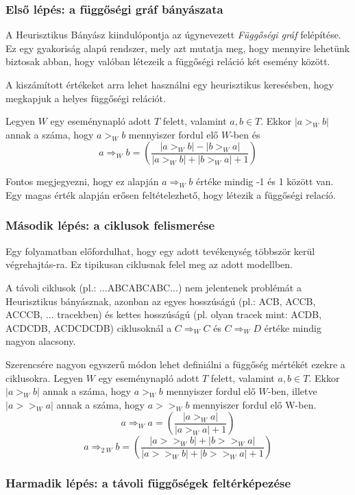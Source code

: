 \subsubsection{Első lépés: a függőségi gráf bányászata}

 A Heurisztikus Bányász kiindulópontja az úgynevezett \textit{Függőségi gráf} felépítése. Ez egy gyakoriság alapú rendszer, mely azt mutatja meg, hogy mennyire lehetünk biztosak abban, hogy valóban létezeik a függőségi reláció két esemény között.

A kiszámított értékeket arra lehet használni egy heurisztikus keresésben, hogy megkapjuk a helyes függőségi relációt.

Legyen $W$ egy eseménynapló adott $T$ felett, valamint $a,b \in T$. Ekkor $|a>_W b|$ annak a száma, hogy $a>_Wb$ mennyiszer fordul elő $W$-ben és
\[
a \Rightarrow_W b = \left(\frac{|a>_Wb|-|b>_Wa|}{|a>_Wb|+|b>_Wa|+1}\right)
\]

Fontos megjegyezni, hogy ez alapján $a\Rightarrow_Wb$ értéke mindig -1 és 1 között van. Egy magas érték alapján erősen feltételezhető, hogy létezik a függőségi relacíó.

\subsubsection{Második lépés: a ciklusok felismerése}

Egy folyamatban előfordulhat, hogy egy adott tevékenység többször kerül végrehajtás\hyp{}ra. Ez tipikusan ciklusnak felel meg az adott modellben.

A távoli ciklusok (pl.: ...ABCABCABC...) nem jelentenek problémát a Heurisztikus bányásznak, azonban az egyes hosszúságú (pl.: ACB, ACCB, ACCCB, ... tracekben) és kettes hosszúságú (pl. olyan tracek mint: ACDB, ACDCDB, ACDCDCDB) ciklusoknál a $C\Rightarrow_WC$ és $C\Rightarrow_WD$ értéke mindig nagyon alacsony.

Szerencsére nagyon egyszerű módon lehet definiálni a függőség mértékét ezekre a ciklusokra. Legyen $W$ egy eseménynapló adott $T$ felett, valamint $a,b \in T$. Ekkor $|a>_W b|$ annak a száma, hogy $a>_Wb$ mennyiszer fordul elő $W$-ben, illetve $|a>>_Wa|$ annak a száma, hogy $a>>_Wb$ mennyiszer fordul elő W-ben.
\[
a\Rightarrow_Wa=\left(\frac{|a>_Wa|}{|a>_Wa|+1}\right)
\]
\[
a\Rightarrow_{2\ W} b=\left(\frac{|a>>_Wb|+|b>>_Wa|}{|a>>_Wb|+|b>>_Wa|+1}\right)
\]

\subsubsection{Harmadik lépés: a távoli függőségek feltérképezése}

